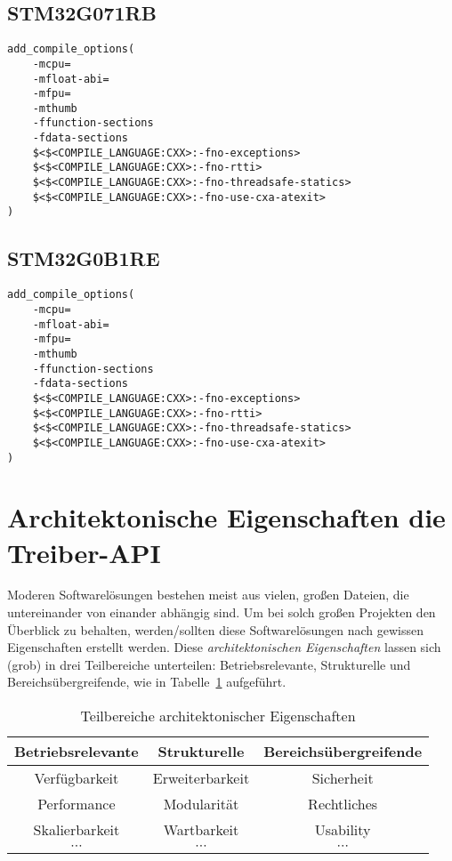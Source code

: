 \subsection{STM32G071RB}
\begin{lstlisting}
add_compile_options(
	-mcpu=
	-mfloat-abi=
	-mfpu=
	-mthumb
	-ffunction-sections
	-fdata-sections
	$<$<COMPILE_LANGUAGE:CXX>:-fno-exceptions>
	$<$<COMPILE_LANGUAGE:CXX>:-fno-rtti>
	$<$<COMPILE_LANGUAGE:CXX>:-fno-threadsafe-statics>
	$<$<COMPILE_LANGUAGE:CXX>:-fno-use-cxa-atexit>
)
\end{lstlisting}


\subsection{STM32G0B1RE}
\begin{lstlisting}
add_compile_options(
	-mcpu=
	-mfloat-abi=
	-mfpu=
	-mthumb
	-ffunction-sections
	-fdata-sections
	$<$<COMPILE_LANGUAGE:CXX>:-fno-exceptions>
	$<$<COMPILE_LANGUAGE:CXX>:-fno-rtti>
	$<$<COMPILE_LANGUAGE:CXX>:-fno-threadsafe-statics>
	$<$<COMPILE_LANGUAGE:CXX>:-fno-use-cxa-atexit>
)
\end{lstlisting}


\section{Architektonische Eigenschaften die Treiber-API}
Moderen Softwarelösungen bestehen meist aus vielen, großen Dateien, die untereinander von einander abhängig sind.
Um bei solch großen Projekten den Überblick zu behalten, werden/sollten diese Softwarelösungen nach gewissen Eigenschaften erstellt werden.
Diese \emph{architektonischen Eigenschaften} lassen sich (grob) in drei Teilbereiche unterteilen: Betriebsrelevante, Strukturelle und Bereichsübergreifende, wie in Tabelle~\ref{tab:architektonische_eigenschaften} aufgeführt. %

\begin{table}[H]
	\begin{center}
		\begin{tabular}{ c | c | c }
			\textbf{Betriebsrelevante} & \textbf{Strukturelle} & \textbf{Bereichsübergreifende}\\
			\hline
			Verfügbarkeit & Erweiterbarkeit & Sicherheit\\
			Performance & Modularität & Rechtliches\\
			Skalierbarkeit & Wartbarkeit & Usability\\
			$\cdots$ & $\cdots$ & $\cdots$\\
		\end{tabular}
		\caption{Teilbereiche architektonischer Eigenschaften}
	    \label{tab:architektonische_eigenschaften}
	\end{center}
\end{table}

